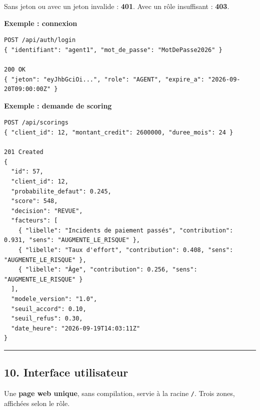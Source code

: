 \documentclass[
  french,
  11pt,
  a4paper,
]{article}
\begin{document}
Sans jeton ou avec un jeton invalide : \textbf{401}. Avec un rôle
insuffisant : \textbf{403}.

\textbf{Exemple : connexion}

\begin{Verbatim}[breaklines=true,breakanywhere=true,fontsize=\small,frame=leftline,framerule=1.6pt,rulecolor=\color{credixblue},framesep=3mm,xleftmargin=2mm,xrightmargin=1mm]
POST /api/auth/login
{ "identifiant": "agent1", "mot_de_passe": "MotDePasse2026" }

200 OK
{ "jeton": "eyJhbGciOi...", "role": "AGENT", "expire_a": "2026-09-20T09:00:00Z" }
\end{Verbatim}

\textbf{Exemple : demande de scoring}

\begin{Verbatim}[breaklines=true,breakanywhere=true,fontsize=\small,frame=leftline,framerule=1.6pt,rulecolor=\color{credixblue},framesep=3mm,xleftmargin=2mm,xrightmargin=1mm]
POST /api/scorings
{ "client_id": 12, "montant_credit": 2600000, "duree_mois": 24 }

201 Created
{
  "id": 57,
  "client_id": 12,
  "probabilite_defaut": 0.245,
  "score": 548,
  "decision": "REVUE",
  "facteurs": [
    { "libelle": "Incidents de paiement passés", "contribution": 0.931, "sens": "AUGMENTE_LE_RISQUE" },
    { "libelle": "Taux d'effort", "contribution": 0.408, "sens": "AUGMENTE_LE_RISQUE" },
    { "libelle": "Âge", "contribution": 0.256, "sens": "AUGMENTE_LE_RISQUE" }
  ],
  "modele_version": "1.0",
  "seuil_accord": 0.10,
  "seuil_refus": 0.30,
  "date_heure": "2026-09-19T14:03:11Z"
}
\end{Verbatim}

\begin{center}\rule{0.5\linewidth}{0.5pt}\end{center}

\subsection{10. Interface utilisateur}\label{10-interface-utilisateur}

Une \textbf{page web unique}, sans compilation, servie à la racine
\texttt{/}. Trois zones, affichées selon le rôle.
\end{document}
